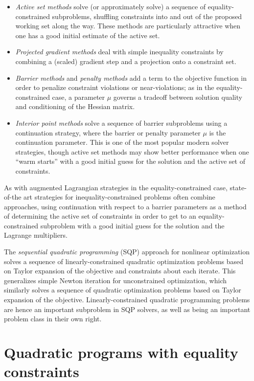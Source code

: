\documentclass[12pt, leqno]{article} %
\providecommand{\tightlist}{%
  \setlength{\itemsep}{0pt}\setlength{\parskip}{0pt}}
\begin{document}
\begin{itemize}
\tightlist
\item
  \emph{Active set methods} solve (or approximately solve) a sequence of
  equality-constrained subproblems, shuffling constraints into and out
  of the proposed working set along the way. These methods are
  particularly attractive when one has a good initial estimate of the
  active set.
\item
  \emph{Projected gradient methods} deal with simple inequality
  constraints by combining a (scaled) gradient step and a projection
  onto a constraint set.
\item
  \emph{Barrier methods} and \emph{penalty methods} add a term to the
  objective function in order to penalize constraint violations or
  near-violations; as in the equality-constrained case, a parameter
  \(\mu\) governs a tradeoff between solution quality and conditioning
  of the Hessian matrix.
\item
  \emph{Interior point methods} solve a sequence of barrier subproblems
  using a continuation strategy, where the barrier or penalty parameter
  \(\mu\) is the continuation parameter. This is one of the most popular
  modern solver strategies, though active set methods may show better
  performance when one ``warm starts'' with a good initial guess for the
  solution and the active set of constraints.
\end{itemize}

As with augmented Lagrangian strategies in the equality-constrained
case, state-of-the art strategies for inequality-constrained problems
often combine approaches, using continuation with respect to a barrier
parameters as a method of determining the active set of constraints in
order to get to an equality-constrained subproblem with a good initial
guess for the solution and the Lagrange multipliers.

The \emph{sequential quadratic programming} (SQP) approach for nonlinear
optimization solves a sequence of linearly-constrained quadratic
optimization problems based on Taylor expansion of the objective and
constraints about each iterate. This generalizes simple Newton iteration
for unconstrained optimization, which similarly solves a sequence of
quadratic optimization problems based on Taylor expansion of the
objective. Linearly-constrained quadratic programming problems are hence
an important subproblem in SQP solvers, as well as being an important
problem class in their own right.

\section{Quadratic programs with equality constraints}
\end{document}
